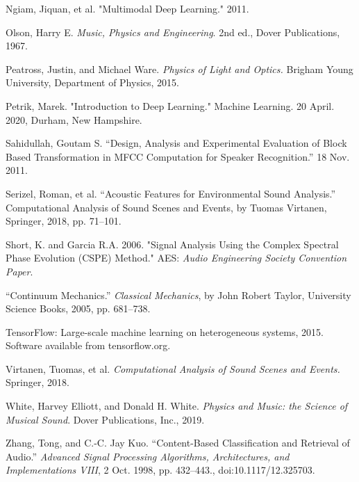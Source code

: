 \documentclass[12pt,letterpaper]{article}
\begin{document}
\begin{thebibliography}{9}
Ngiam, Jiquan, et al. "Multimodal Deep Learning." 2011. 

Olson, Harry E. \textit{Music, Physics and Engineering}. 2nd ed., Dover Publications, 1967.

Peatross, Justin, and Michael Ware. \textit{Physics of Light and Optics.} Brigham Young University, Department of Physics, 2015.

Petrik, Marek. "Introduction to Deep Learning." Machine Learning. 20 April. 2020, Durham, New Hampshire.

Sahidullah, Goutam S. “Design, Analysis and Experimental Evaluation of Block Based Transformation in MFCC Computation for Speaker Recognition.” 18 Nov. 2011. 

Serizel, Roman, et al. “Acoustic Features for Environmental Sound Analysis.” Computational Analysis of Sound Scenes and Events, by Tuomas Virtanen, Springer, 2018, pp. 71–101. 

Short, K. and Garcia R.A. 2006. "Signal Analysis Using the Complex Spectral Phase Evolution (CSPE) Method." AES: \textit{Audio Engineering Society Convention Paper}.

“Continuum Mechanics.” \textit{Classical Mechanics}, by John Robert Taylor, University Science Books, 2005, pp. 681–738. 

TensorFlow: Large-scale machine learning on heterogeneous systems,
2015. Software available from tensorflow.org.

Virtanen, Tuomas, et al. \textit{Computational Analysis of Sound Scenes and Events.} Springer, 2018.

White, Harvey Elliott, and Donald H. White. \textit{Physics and Music: the Science of Musical Sound}. Dover Publications, Inc., 2019.

Zhang, Tong, and C.-C. Jay Kuo. “Content-Based Classification and Retrieval of Audio.” \textit{Advanced Signal Processing Algorithms, Architectures, and Implementations VIII}, 2 Oct. 1998, pp. 432–443., doi:10.1117/12.325703.

\end{thebibliography}

\end{document}
